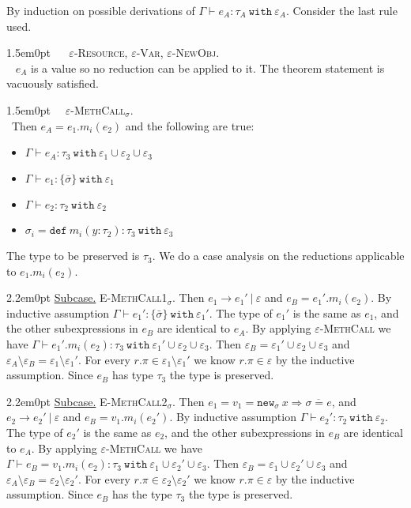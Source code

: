 \documentclass{llncs}
\newcommand{\keywadj}[1]{\mathtt{#1}}
\newcommand{\keyw}[1]{\keywadj{#1}~}
\newcommand{\proofcase}[2]{
	\begin{adjustwidth}{1.5em}{0pt}
		\fbox{Case.}~~#1. \\ ~#2
	\end{adjustwidth}
}
\newcommand{\subcase}[1] {
	\begin{adjustwidth}{2.2em}{0pt}
		\underline{Subcase.} #1
	\end{adjustwidth}
}
\newcommand{\newsig}[0]{
	\keywadj{new}_\sigma~x \Rightarrow \overline{\sigma = e}
}
\begin{document}
{By induction on possible derivations of $\Gamma \vdash e_A : \tau_A~\keyw{with} \varepsilon_A$. Consider the last rule used.\\

	\proofcase{ \textsc{$\varepsilon$-Resource}, \textsc{$\varepsilon$-Var}, \textsc{$\varepsilon$-NewObj}} {
		$e_A$ is a value so no reduction can be applied to it. The theorem statement is vacuously satisfied.\\ }
	
	\proofcase{\textsc{$\varepsilon$-MethCall$_{\sigma}$}}
	{Then $e_A = e_1.m_i(e_2)$ and the following are true:
\begin{itemize}
	\item $\Gamma \vdash e_A : \tau_3~\keyw{with} \varepsilon_1 \cup \varepsilon_2 \cup \varepsilon_3$
	\item $\Gamma \vdash e_1  : \{ \overline \sigma \}~ \keyw{with} \varepsilon_1$
	\item $\Gamma \vdash e_2 : \tau_2~\keyw{with} \varepsilon_2$
	\item $\sigma_i = \keyw{def} m_i(y : \tau_2) : \tau_3~ \keyw{with} \varepsilon_3$
\end{itemize}
The type to be preserved is $\tau_3$. We do a case analysis on the reductions applicable to $e_1.m_i(e_2)$.

		\subcase{ \textsc{E-MethCall1$_\sigma$.} Then $e_1 \longrightarrow e_1'~|~\varepsilon$ and $e_B = e_1'.m_i(e_2)$. By inductive assumption $\Gamma \vdash e_1' : \{ \bar \sigma \}~\keyw{with} \varepsilon_1'$. The type of $e_1'$ is the same as $e_1$, and the other subexpressions in $e_B$ are identical to $e_A$. By applying \textsc{$\varepsilon$-MethCall} we have $\Gamma \vdash e_1'.m_i(e_2) : \tau_3~\keyw{with} \varepsilon_1' \cup \varepsilon_2 \cup \varepsilon_3$. Then $\varepsilon_B = \varepsilon_1' \cup \varepsilon_2 \cup \varepsilon_3$ and $\varepsilon_A \setminus \varepsilon_B = \varepsilon_1 \setminus \varepsilon_1'$. For every $r.\pi \in \varepsilon_1 \setminus \varepsilon_1'$ we know $r.\pi \in \varepsilon$ by the inductive assumption. Since $e_B$ has type $\tau_3$ the type is preserved.}
		
		\subcase{ \textsc{E-MethCall2$_\sigma$.} 	Then $e_1 = v_1 = \newsig$, and $e_2 \longrightarrow e_2'~|~\varepsilon$ and $e_B = v_1.m_i(e_2')$. By inductive assumption $\Gamma \vdash e_2' : \tau_2~\keyw{with} \varepsilon_2$. The type of $e_2'$ is the same as $e_2$, and the other subexpressions in $e_B$ are identical to $e_A$. By applying \textsc{$\varepsilon$-MethCall} we have $\Gamma \vdash e_B = v_1.m_i(e_2) : \tau_3~\keyw{with} \varepsilon_1 \cup \varepsilon_2' \cup \varepsilon_3$. Then $\varepsilon_B = \varepsilon_1 \cup \varepsilon_2' \cup \varepsilon_3$ and $\varepsilon_A \setminus \varepsilon_B = \varepsilon_2 \setminus \varepsilon_2'$. For every $r.\pi \in \varepsilon_2 \setminus \varepsilon_2'$ we know $r.\pi \in \varepsilon$ by the inductive assumption. Since $e_B$ has the type $\tau_3$ the type is preserved.}
		
}}
\end{document}
